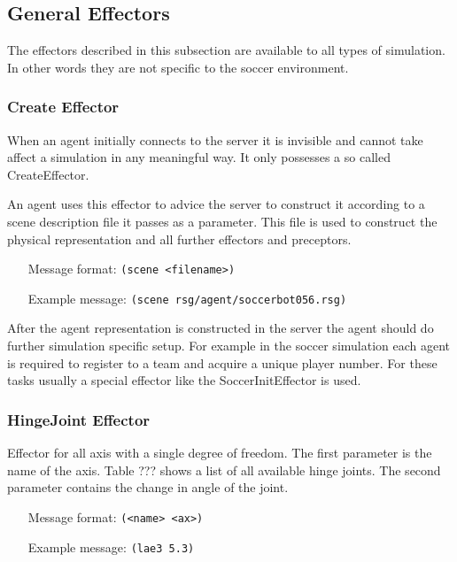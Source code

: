 \subsection{General Effectors}
The effectors described in this subsection are available to all types of
simulation. In other words they are not specific to the soccer environment.

\subsubsection{Create Effector}

When an agent initially connects to the server it is invisible and
cannot take affect a simulation in any meaningful way. It only
possesses a so called CreateEffector.

An agent uses this effector to advice the server to construct it
according to a scene description file it passes as a parameter. This
file is used to construct the physical representation and all further
effectors and preceptors.
\begin{itemize}
	\item[Message format:] \texttt{(scene  <filename>)}
	\item[Example message:] \texttt{(scene rsg/agent/soccerbot056.rsg)}
\end{itemize}

After the agent representation is constructed in the server the agent
should do further simulation specific setup. For example in the soccer
simulation each agent is required to register to a team and acquire a
unique player number. For these tasks usually a special effector like
the SoccerInitEffector is used.


\subsubsection{HingeJoint Effector}
Effector for all axis with a single degree of freedom.
The first parameter is the name of the axis. Table ??? shows a list of all
available hinge joints. The second parameter contains the change in angle of
the joint.
\begin{itemize}
	\item[Message format:] \texttt{(<name> <ax>)}
	\item[Example message:] \texttt{(lae3 5.3)}
\end{itemize}

